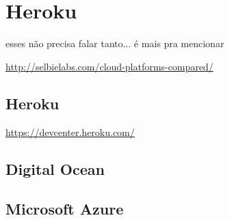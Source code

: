 \chapter{Heroku}

esses não precisa falar tanto... é mais pra mencionar

\url{http://selbielabs.com/cloud-platforms-compared/}

\section{Heroku}

\url{https://devcenter.heroku.com/}

\section{Digital Ocean}

\section{Microsoft Azure}
